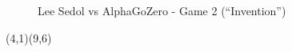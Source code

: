 \documentclass{article}
\begin{document}
  \setgounit{0.7cm}

  \begin{figure}[!thbp]
    \begin{center}
      \begin{psgoboard*}[19]
      \end{psgoboard*}
      \caption{Lee Sedol vs AlphaGoZero - Game 2 (“Invention”)}\label{Figure:LS-vs-AG-Game2}
    \end{center}
  \end{figure}

  \begin{psgopartialboard}[9]{(4,1)(9,6)}
  \end{psgopartialboard}
\end{document}
